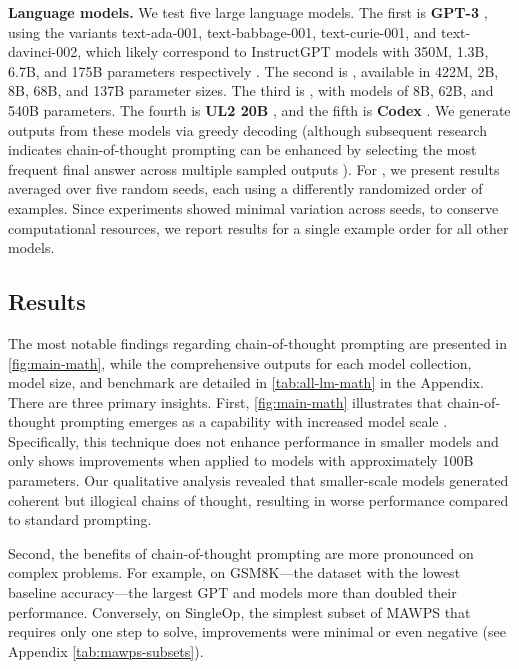 \textbf{Language models.} We test five large language models. The first is \textbf{GPT-3} \citep{brown2020language}, using the variants text-ada-001, text-babbage-001, text-curie-001, and text-davinci-002, which likely correspond to InstructGPT models with 350M, 1.3B, 6.7B, and 175B parameters respectively \citep{ouyang2022training}. The second is \textbf{\lamda{}} \citep{thoppilan2022lamda}, available in 422M, 2B, 8B, 68B, and 137B parameter sizes. The third is \textbf{\palm{}}, with models of 8B, 62B, and 540B parameters. The fourth is \textbf{UL2 20B} \citep{tay2022unifying}, and the fifth is \textbf{Codex} \citep[][code-davinci-002 in the OpenAI API]{chen2021evaluating}. We generate outputs from these models via greedy decoding (although subsequent research indicates chain-of-thought prompting can be enhanced by selecting the most frequent final answer across multiple sampled outputs \citep{wang2022self}). For \lamda{}, we present results averaged over five random seeds, each using a differently randomized order of examples. Since \lamda{} experiments showed minimal variation across seeds, to conserve computational resources, we report results for a single example order for all other models.

\subsection{Results}  
The most notable findings regarding chain-of-thought prompting are presented in \cref{fig:main-math}, while the comprehensive outputs for each model collection, model size, and benchmark are detailed in \cref{tab:all-lm-math} in the Appendix. There are three primary insights. First, \cref{fig:main-math} illustrates that chain-of-thought prompting emerges as a capability with increased model scale \citep{wei2022emergent}. Specifically, this technique does not enhance performance in smaller models and only shows improvements when applied to models with approximately 100B parameters. Our qualitative analysis revealed that smaller-scale models generated coherent but illogical chains of thought, resulting in worse performance compared to standard prompting.

  
Second, the benefits of chain-of-thought prompting are more pronounced on complex problems. For example, on GSM8K—the dataset with the lowest baseline accuracy—the largest GPT and \palm{} models more than doubled their performance. Conversely, on SingleOp, the simplest subset of MAWPS that requires only one step to solve, improvements were minimal or even negative (see Appendix \cref{tab:mawps-subsets}).

